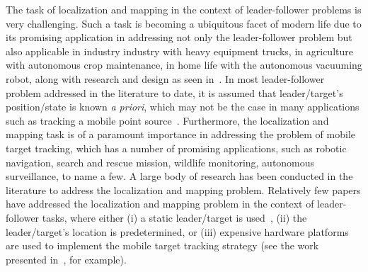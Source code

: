 \documentclass[conference]{IEEEtran}
\begin{document}
 

The task of localization and mapping in the context of leader-follower problems is very challenging. Such a task is becoming a ubiquitous  facet of modern life due to its promising application in addressing not only the leader-follower problem but also applicable in industry industry with heavy equipment trucks, in agriculture with autonomous crop maintenance, in home life with the autonomous vacuuming robot, along with research and design as seen in~\cite{Roberts2007,Durmus2015,Elara2014,HevrdejsKnoll2017-Indoor}.  In most leader-follower problem addressed in the literature to date, it is assumed that leader/target's position/state is known \textit{a priori}, which may not be the case in many applications such as tracking a mobile point source~\cite{Xu2013}. Furthermore, the localization and mapping task is of a paramount importance in addressing the problem of mobile target tracking, which has a number of promising applications, such as robotic navigation, search and rescue mission, wildlife monitoring, autonomous surveillance, to name a few. A large body of research has been conducted in the literature to address the localization and mapping problem. Relatively few papers have addressed the localization and mapping problem in the context of leader-follower tasks, where either (i) a static leader/target is used~\cite{Fernando2015}, (ii) the leader/target's location is predetermined, or (iii) expensive hardware platforms are used to implement the mobile target tracking strategy (see the work presented in~\cite{Yang2014}, for example). 
\end{document}
